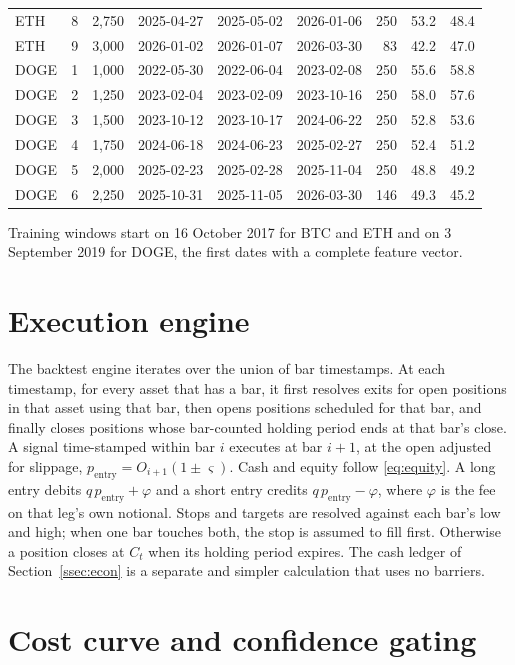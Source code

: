 \documentclass[preprint,12pt,authoryear,a4paper]{elsarticle}
\begin{document}
\begin{center}
\begin{longtable}{@{}llrlllrrr@{}}
ETH  & 8 & 2,750 & 2025-04-27 & 2025-05-02 & 2026-01-06 & 250 & 53.2 & 48.4 \\
ETH  & 9 & 3,000 & 2026-01-02 & 2026-01-07 & 2026-03-30 & 83  & 42.2 & 47.0 \\
\midrule
DOGE & 1 & 1,000 & 2022-05-30 & 2022-06-04 & 2023-02-08 & 250 & 55.6 & 58.8 \\
DOGE & 2 & 1,250 & 2023-02-04 & 2023-02-09 & 2023-10-16 & 250 & 58.0 & 57.6 \\
DOGE & 3 & 1,500 & 2023-10-12 & 2023-10-17 & 2024-06-22 & 250 & 52.8 & 53.6 \\
DOGE & 4 & 1,750 & 2024-06-18 & 2024-06-23 & 2025-02-27 & 250 & 52.4 & 51.2 \\
DOGE & 5 & 2,000 & 2025-02-23 & 2025-02-28 & 2025-11-04 & 250 & 48.8 & 49.2 \\
DOGE & 6 & 2,250 & 2025-10-31 & 2025-11-05 & 2026-03-30 & 146 & 49.3 & 45.2 \\
\end{longtable}
\end{center}

Training windows start on 16 October 2017 for BTC and ETH and on 3 September 2019
for DOGE, the first dates with a complete feature vector.

\section{Execution engine}\label{app:execution}

The backtest engine iterates over the union of bar timestamps. At each timestamp,
for every asset that has a bar, it first resolves exits for open positions in that
asset using that bar, then opens positions scheduled for that bar, and finally
closes positions whose bar-counted holding period ends at that bar's close. A
signal time-stamped within bar $i$ executes at bar $i+1$, at the open adjusted for
slippage, $p_{\text{entry}}=O_{i+1}(1\pm\varsigma)$. Cash and equity follow
\eqref{eq:equity}. A long entry debits $q\,p_{\text{entry}}+\varphi$ and a short
entry credits $q\,p_{\text{entry}}-\varphi$, where $\varphi$ is the fee on that
leg's own notional. Stops and targets are resolved against each bar's low and high;
when one bar touches both, the stop is assumed to fill first. Otherwise a position
closes at $C_t$ when its holding period expires. The cash ledger of
Section~\ref{ssec:econ} is a separate and simpler calculation that uses no
barriers.

\section{Cost curve and confidence gating}\label{app:sensitivity}
\end{document}
